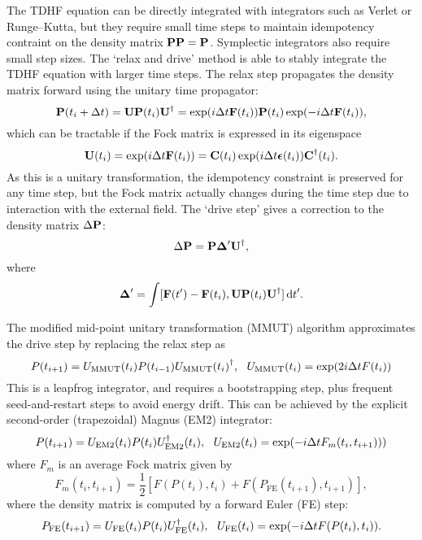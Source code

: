\documentclass{article}
\begin{document}
The TDHF equation can be directly integrated with integrators such as Verlet or Runge--Kutta, but they require small time steps to maintain idempotency contraint on the density matrix $\bm{\mathrm{PP}}=\bm{\mathrm{P}}$. Symplectic integrators also require small step sizes. The `relax and drive' method is able to stably integrate the TDHF equation with larger time steps. The relax step propagates the density matrix forward using the unitary time propagator:
\begin{equation}
    \bm{\mathrm{P}}(t_i+\Delta t)=\bm{\mathrm{UP}}(t_i)\bm{\mathrm{U}}^{\dagger}=\exp(i\Delta t\bm{\mathrm{F}}(t_i))\bm{\mathrm{P}}(t_i)\exp(-i\Delta t\bm{\mathrm{F}}(t_i)),
\end{equation}
which can be tractable if the Fock matrix is expressed in its eigenspace
\begin{equation}
    \bm{\mathrm{U}}(t_i)=\exp(i\Delta t\bm{\mathrm{F}}(t_i))=\bm{\mathrm{C}}(t_i)\exp(i\Delta t\bm{\mathrm{\epsilon}}(t_i))\bm{\mathrm{C}}^{\dagger}(t_i).
\end{equation}
As this is a unitary transformation, the idempotency constraint is preserved for any time step, but the Fock matrix actually changes during the time step due to interaction with the external field. The `drive step' gives a correction to the density matrix $\Delta\bm{\mathrm{P}}$:
\begin{equation}
    \Delta\bm{\mathrm{P}}=\bm{\mathrm{P\Delta}}'\bm{\mathrm{U}}^{\dagger},
\end{equation}
where
\begin{equation}
    \bvec{\Delta}'=\int[\bvec{F}(t')-\bvec{F}(t_i),\bvec{UP}(t_i)\bvec{U}\adj ]\dl t'.
\end{equation}

The modified mid-point unitary transformation (MMUT) algorithm approximates the drive step by replacing the relax step as 
\begin{equation}
{P}(t_{i+1})={U_{\mathrm{MMUT}}(t_i)P}(t_{i-1}){U_{\mathrm{MMUT}}(t_i)}\adj,\ \ {U_{\mathrm{MMUT}}(t_i)}=\exp(2i\Delta t{F}(t_i))
\end{equation}
This is a leapfrog integrator, and requires a bootstrapping step, plus frequent seed-and-restart steps to avoid energy drift. This can be achieved by the explicit second-order (trapezoidal) Magnus (EM2) integrator:
\begin{equation}
    P(t_{i+1})=U_{\mathrm{EM2}}(t_i)P(t_i)U_{\mathrm{EM2}}\adj(t_i),\ \ U_{\mathrm{EM2}}(t_i)=\exp(-i\Delta tF_m(t_i,t_{i+1})))
\end{equation}
where $F_m$ is an average Fock matrix given by
\begin{equation}
    F_m(t_i,t_{i+1})=\frac{1}{2}[F(P(t_i),t_i)+F(P_{\mathrm{FE}}(t_{i+1}),t_{i+1})],
\end{equation}
where the density matrix is computed by a forward Euler (FE) step:
\begin{equation}
    P_{\mathrm{FE}}(t_{i+1})=U_{\mathrm{FE}}(t_i)P(t_i)U\adj_{\mathrm{FE}}(t_i),\ \ U_{\mathrm{FE}}(t_i)=\exp(-i\Delta tF(P(t_i),t_i)).
\end{equation}
\end{document}
